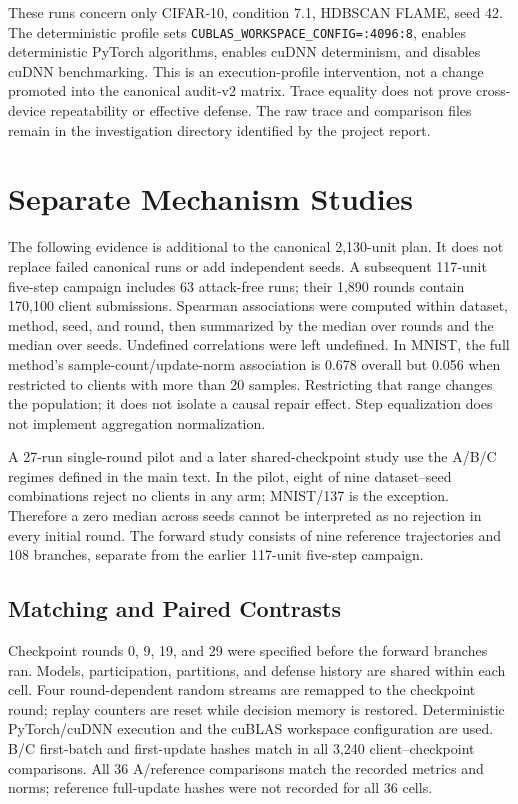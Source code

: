 \documentclass[journal]{IEEEtran}
\begin{document}
These runs concern only CIFAR-10, condition 7.1, HDBSCAN FLAME, seed 42. The deterministic profile sets \texttt{CUBLAS\_WORKSPACE\_CONFIG=:4096:8}, enables deterministic PyTorch algorithms, enables cuDNN determinism, and disables cuDNN benchmarking. This is an execution-profile intervention, not a change promoted into the canonical audit-v2 matrix. Trace equality does not prove cross-device repeatability or effective defense. The raw trace and comparison files remain in the investigation directory identified by the project report.


\section{Separate Mechanism Studies}
The following evidence is additional to the canonical 2,130-unit plan. It does not replace failed canonical runs or add independent seeds. A subsequent 117-unit five-step campaign includes 63 attack-free runs; their 1,890 rounds contain 170,100 client submissions. Spearman associations were computed within dataset, method, seed, and round, then summarized by the median over rounds and the median over seeds. Undefined correlations were left undefined. In MNIST, the full method's sample-count/update-norm association is 0.678 overall but 0.056 when restricted to clients with more than 20 samples. Restricting that range changes the population; it does not isolate a causal repair effect. Step equalization does not implement aggregation normalization.

A 27-run single-round pilot and a later shared-checkpoint study use the A/B/C regimes defined in the main text. In the pilot, eight of nine dataset--seed combinations reject no clients in any arm; MNIST/137 is the exception. Therefore a zero median across seeds cannot be interpreted as no rejection in every initial round. The forward study consists of nine reference trajectories and 108 branches, separate from the earlier 117-unit five-step campaign.

\subsection{Matching and Paired Contrasts}
Checkpoint rounds 0, 9, 19, and 29 were specified before the forward branches ran. Models, participation, partitions, and defense history are shared within each cell. Four round-dependent random streams are remapped to the checkpoint round; replay counters are reset while decision memory is restored. Deterministic PyTorch/cuDNN execution and the cuBLAS workspace configuration are used. B/C first-batch and first-update hashes match in all 3,240 client--checkpoint comparisons. All 36 A/reference comparisons match the recorded metrics and norms; reference full-update hashes were not recorded for all 36 cells.
\end{document}
